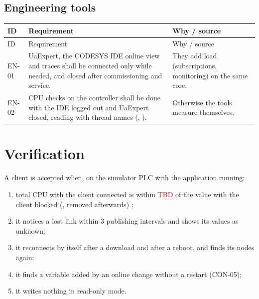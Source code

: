 \documentclass[11pt,a4paper]{article}
\makeatletter
\newenvironment{reqtable}{%
  \begin{small}
  \setlength{\tabcolsep}{4pt}%
  \begin{longtable}{@{}P{14mm}P{86mm}P{60mm}@{}}
  \toprule
  ID & Requirement & Why / source\\
  \midrule
  \endfirsthead
  \toprule
  ID & Requirement & Why / source\\
  \midrule
  \endhead
  \bottomrule
  \endfoot
}{%
  \end{longtable}
  \end{small}
}
\newcommand{\TBD}{\textcolor{red}{TBD}}
\makeatother
\begin{document}
\subsection{Engineering tools}
\begin{reqtable}
EN-01 & UaExpert, the CODESYS IDE online view and traces shall be connected only while needed, and
closed after commissioning and service. & They add load (subscriptions, monitoring) on the same core.\\
EN-02 & CPU checks on the controller shall be done with the IDE logged out and UaExpert closed,
reading  with thread names (, ). & Otherwise the tools
measure themselves.\\
\end{reqtable}

\section{Verification}
\label{sec:verify}
A client is accepted when, on the simulator PLC with the application running:
\begin{enumerate}[nosep]
  \item total CPU with the client connected is within \TBD{} of the value with the client blocked
        (, removed afterwards) ;
  \item it notices a lost link within 3 publishing intervals and shows its values as unknown;
  \item it reconnects by itself after a download and after a reboot, and finds its nodes again;
  \item it finds a variable added by an online change without a restart (CON-05);
  \item it writes nothing in read-only mode.
\end{enumerate}

\end{document}
